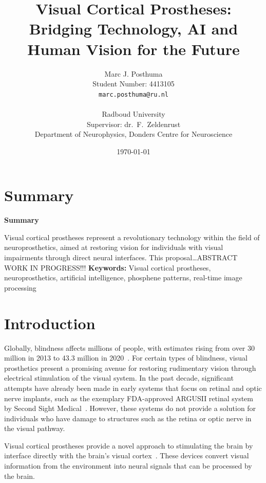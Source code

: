 \documentclass[10pt]{article}
\title{Visual Cortical Prostheses: Bridging Technology, AI and Human Vision for the Future}
\author{
  Marc J. Posthuma\\
  Student Number: 4413105\\
  \texttt{marc.posthuma@ru.nl}\\
  \\
  Radboud University\\
  Supervisor: dr.\ F.\ Zeldenrust\\
  Department of Neurophysics, Donders Centre for Neuroscience
}
\date{\today}
\makeatletter
\renewenvironment{abstract}{%
    \if@twocolumn%
      \section*{\abstractname}%
    \else
      \begin{center}%
        {\bfseries \large\abstractname\vspace{-.5em}\vspace{\z@}}%
      \end{center}%
      \quotation\small %
    \fi}
    {\if@twocolumn\else\endquotation\fi}%
\renewcommand{\abstractname}{Summary}
\makeatother
\begin{document}
\pagestyle{plain}%
\listoftodos%
\clearpage%

\newpage%

\maketitle
\thispagestyle{firstpage} %
\begin{abstract}
  \noindent Visual cortical prostheses represent a revolutionary technology
  within the field of neuro\-prosthetics, aimed at restoring vision for
  individuals with visual impairments through direct neural interfaces. This
  proposal\ldots ABSTRACT WORK IN PROGRESS!!!
\end{abstract}
\textbf{Keywords:} Visual cortical prostheses, neuroprosthetics, artificial intelligence, phosphene patterns, real-time image processing
\vspace{1cm}

\thispagestyle{firstpage}
\section*{Introduction}\label{sec:intro}
Globally, blindness affects millions of people, with estimates rising from over
30 million in 2013 to 43.3 million in
2020~\parencite{stevensGlobalPrevalenceVision2013,bourneTrendsPrevalenceBlindness2021}.
For certain types of blindness, visual prosthetics present a promising avenue
for restoring rudimentary vision through electrical stimulation of the visual
system. In the past decade, significant attempts have already been made in early
systems that focus on retinal and optic nerve implants, such as the exemplary
FDA-approved ARGUSII retinal system by Second Sight
Medical~\parencite{hoLongTermResultsEpiretinal2015}. However, these systems do
not provide a solution for individuals who have damage to structures such as the
retina or optic nerve in the visual pathway.

Visual cortical prostheses provide a novel approach to stimulating the brain by
interface directly with the brain's visual
cortex~\parencite{deruytervansteveninckRealworldIndoorMobility2022}.
These devices convert visual information from the environment into neural
signals that can be processed by the brain.
\end{document}
